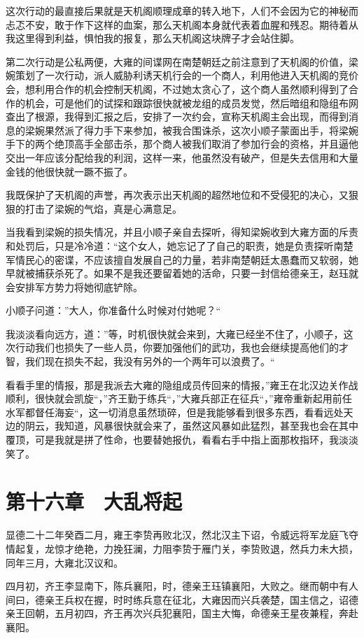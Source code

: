 这次行动的最直接后果就是天机阁顺理成章的转入地下，人们不会因为它的神秘而忐忑不安，敢于作下这样的血案，那么天机阁本身就代表着血腥和残忍。期待着从我这里得到利益，惧怕我的报复，那么天机阁这块牌子才会站住脚。

第二次行动是公私两便，大雍的间谍网在南楚朝廷之前注意到了天机阁的价值，梁婉策划了一次行动，派人威胁利诱天机行会的一个商人，利用他进入天机阁的竞价会，想利用合作的机会控制天机阁，不过她太贪心了，这个商人虽然顺利得到了合作的机会，可是他们的试探和跟踪很快就被龙组的成员发觉，然后暗组和隐组布网查出了根源，我得到汇报之后，安排了一次约会，宣称天机阁主会出现，而得到消息的梁婉果然派了得力手下来参加，被我合围诛杀，这次小顺子蒙面出手，将梁婉手下的两个绝顶高手全部击杀，那个商人被我们取消了参加行会的资格，并且逼他交出一年应该分配给我的利润，这样一来，他虽然没有破产，但是失去信用和大量金钱的他很快就一蹶不振了。

我既保护了天机阁的声誉，再次表示出天机阁的超然地位和不受侵犯的决心，又狠狠的打击了梁婉的气焰，真是心满意足。

当我看到梁婉的损失情况，并且小顺子亲自去探听，得知梁婉收到大雍方面的斥责和处罚后，只是冷冷道：“这个女人，她忘记了了自己的职责，她是负责探听南楚军情民心的密谍，不应该擅自发展自己的力量，若非南楚朝廷太愚蠢而又软弱，她早就被捕获杀死了。如果不是我还要留着她的活命，只要一封信给德亲王，赵珏就会安排军方势力将她彻底铲除。

小顺子问道：”大人，你准备什么时候对付她呢？“

我淡淡看向远方，道：”等，时机很快就会来到，大雍已经坐不住了，小顺子，这次行动我们也损失了一些人员，你要加强他们的武功，我也会继续提高他们的才智，我们现在损失不起，我没有另外的一个两年可以浪费了。“

看看手里的情报，那是我派去大雍的隐组成员传回来的情报，”雍王在北汉边关作战顺利，很快就会凯旋“，”齐王勤于练兵“，”大雍兵部正在征兵“，”雍帝重新起用前任水军都督任海妄“，这一切消息虽然琐碎，但是我能够看到很多东西，看看远处天边的阴云，我知道，风暴很快就会来了，虽然这风暴如此猛烈，甚至我也会在其中覆顶，可是我就是拼了性命，也要替她报仇，看看右手中指上面那枚指环，我淡淡笑了。

\chapter{第十六章　大乱将起}

显德二十二年癸酉二月，雍王李贽再败北汉，然北汉主下诏，令威远将军龙庭飞夺情起复，龙惊才绝艳，力挽狂澜，力阻李贽于雁门关，李贽败退，然兵力未大损，同年三月，大雍北汉议和。

四月初，齐王李显南下，陈兵襄阳，时，德亲王珏镇襄阳，大败之。继而朝中有人间曰，德亲王兵权在握，时时练兵意在征北，大雍因而兴兵袭楚，国主信之，诏德亲王回朝，五月初四，齐王再次兴兵犯襄阳，国主大悔，命德亲王星夜兼程，奔赴襄阳。

